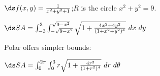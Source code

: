{$\ds f(x,y) = \frac{1}{x^2+y^2+1}$;\quad $R$ is the circle $x^2+y^2=9$.

}
{$\ds SA = \int_{-3}^{3}\int_{-\sqrt{9-x^2}}^{\sqrt{9-x^2}} \sqrt{1+ \frac{4x^2+4y^2}{(1+x^2+y^2)^4}}\ dx\ dy$

Polar offers simpler bounds:

$\ds SA = \int_0^{2\pi}\int_0^3 r\sqrt{1+\frac{4r^2}{(1+r^2)^4}}\ dr\ d\theta$
}